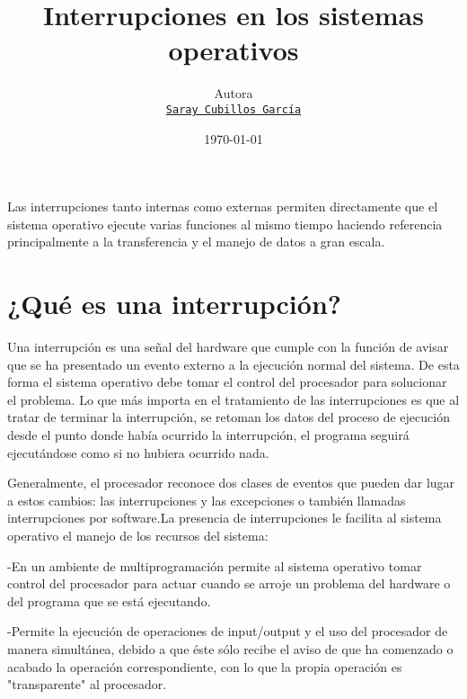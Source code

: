 \documentclass[11pt]{article}
\title{Interrupciones en los sistemas operativos}
\author{Autora\\%
    \href{mailto:saray.cubillos@udea.edu.co}{\texttt{Saray Cubillos García}} %
    }
\date{\today}
\begin{document}
{
\maketitle

Las interrupciones tanto internas como externas permiten directamente que el sistema operativo ejecute varias funciones al mismo tiempo  haciendo referencia principalmente a la transferencia y el manejo de datos a gran escala.

\noindent
\noindent

}



\section{¿Qué es una interrupción?}
Una interrupción es una señal del hardware que cumple con la función de avisar que se ha presentado un evento externo a la ejecución normal del sistema. De esta forma el sistema operativo debe tomar el control del procesador para solucionar el problema. Lo que más importa en el tratamiento de las interrupciones es que al tratar de terminar la interrupción, se retoman los datos del proceso de ejecución desde el punto donde había ocurrido la interrupción, el programa seguirá ejecutándose como si no hubiera ocurrido nada.

Generalmente, el procesador reconoce dos clases de eventos que pueden dar lugar a estos cambios: las interrupciones y las excepciones o también llamadas interrupciones por software.La presencia de interrupciones le facilita al sistema operativo el manejo de los recursos del sistema:

-En un ambiente de multiprogramación permite al sistema operativo tomar control del procesador para actuar cuando se arroje un problema del hardware o del programa que se está ejecutando.

-Permite la ejecución de operaciones de input/output y el uso del procesador de manera simultánea, debido a que éste sólo recibe el aviso de que ha comenzado o acabado la operación correspondiente, con lo que la propia operación es "transparente" al procesador.
\end{document}
